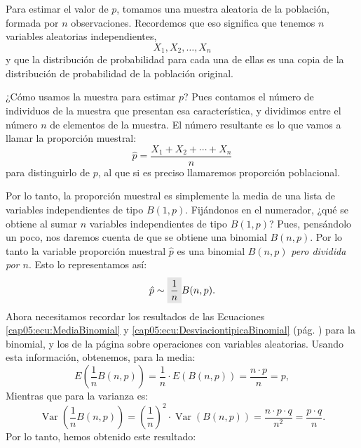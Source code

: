 Para estimar el valor de $p$, tomamos una muestra aleatoria de la población, formada por $n$
observaciones. Recordemos que eso significa que tenemos $n$ variables aleatorias independientes,
    \[X_1,X_2,\ldots,X_n\]
y que la distribución de probabilidad para cada una de ellas es una copia de la distribución de
probabilidad de la población original.

¿Cómo usamos la muestra para estimar $p$? Pues contamos el número de individuos de la muestra que
presentan esa característica, y dividimos entre el número $n$ de elementos de la muestra. El número
resultante es lo que vamos a llamar la {\sf proporción muestral:}
    \begin{equation}\label{cap08:ecu:ProporcionMuestral}
        \hat p=\dfrac{X_1+X_2+\cdots+X_n}{n}
    \end{equation}
para distinguirlo de $p$, al que si es preciso llamaremos {\sf proporción
poblacional}.

Por lo tanto, la proporción muestral es simplemente la media de una lista de variables
independientes de tipo $B(1,p)$. Fijándonos en el numerador, ¿qué se obtiene  al sumar $n$
variables independientes de tipo $B(1,p)$? Pues, pensándolo un poco, nos daremos cuenta de que se
obtiene una binomial $B(n,p)$. Por lo tanto la variable proporción muestral $\hat p$ es una
binomial $B(n,p)$ {\em pero dividida por $n$}. Esto lo representamos así:
    \[\hat p \sim \colorbox{lightgrey}{${\dfrac{1}{n}}$}B(n,p).\]
Ahora necesitamos recordar los resultados de las Ecuaciones \ref{cap05:ecu:MediaBinomial} y
\ref{cap05:ecu:DesviaciontipicaBinomial} (pág. \pageref{cap05:ecu:MediaBinomial}) para la binomial,
y los de la página \pageref{cap04:lugar:OperacionesVariablesAleatorias} sobre operaciones con
variables aleatorias. Usando esta información, obtenemos, para la media:
    \[E\left(\dfrac{1}{n}B(n,p)\right)=\dfrac{1}{n}\cdot E(B(n,p))=\dfrac{n\cdot p}{n}=p,\]
Mientras que para la varianza es:
    \[\operatorname{Var}\left(\dfrac{1}{n}B(n,p)\right)=\left(\dfrac{1}{n}\right)^2\cdot \operatorname{Var}(B(n,p))=\dfrac{n\cdot p\cdot q}{n^2}=\dfrac{p\cdot q}{n}.\]
Por lo tanto, hemos obtenido este resultado:

